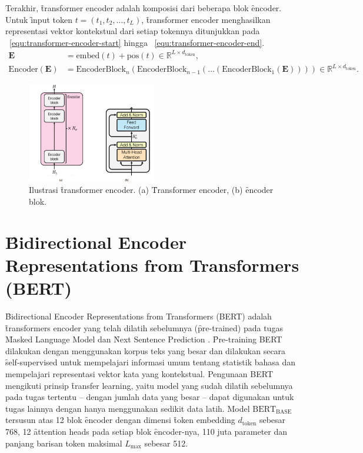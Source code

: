 	Terakhir, \f{transformer encoder} adalah komposisi dari beberapa blok \f{encoder}. Untuk \f{input} token $t=(t_1, t_2, \dots, t_L)$, \f{transformer encoder} menghasilkan representasi vektor kontekstual dari setiap tokennya ditunjukkan pada \equ~\ref{equ:transformer-encoder-start} hingga \equ~\ref{equ:transformer-encoder-end}.
	\begin{align}
		\label{equ:transformer-encoder-start} 
		\mathbf{E} &= \text{embed}(t)+ \text{pos}(t) \in \mathbb{R}^{L \times d_{\text{token}}}, \\
		\label{equ:transformer-encoder-end}
		\text{Encoder}(\mathbf{E}) &= \text{EncoderBlock}_n(\text{EncoderBlock}_{n-1}(\dots(\text{EncoderBlock}_1(\mathbf{E})))) \in \mathbb{R}^{L \times d_{\text{token}}}.
	\end{align}
	\begin{figure}
		\centering
		\includegraphics[width=0.5\textwidth]{assets/pics/final-transformers-encoder.png}
		\caption{Ilustrasi \f{transformer encoder}. (a) \f{Transformer encoder}, (b) \f{encoder} blok.}
		\label{fig:transformer-encoder}
	\end{figure}

\section{\f{Bidirectional Encoder Representations from Transformers} (BERT)}
\f{Bidirectional Encoder Representations from Transformers} (BERT) adalah \f{transformers encoder} yang telah dilatih sebelumnya (\f{pre-trained}) pada tugas \f{Masked Language Model} dan \f{Next Sentence Prediction} \citep{bertori}. \f{Pre-training} BERT dilakukan dengan menggunakan korpus teks yang besar dan dilakukan secara \f{self-supervised} untuk mempelajari informasi umum tentang statistik bahasa dan mempelajari representasi vektor kata yang kontekstual. Pengunaan BERT mengikuti prinsip \f{transfer learning}, yaitu model yang sudah dilatih sebelumnya pada tugas tertentu -- dengan jumlah data yang besar -- dapat digunakan untuk tugas lainnya dengan hanya menggunakan sedikit data latih. Model $\text{BERT}_{\text{BASE}}$ tersusun atas 12 blok \f{encoder} dengan dimensi \f{token embedding} $d_{\text{token}}$ sebesar 768, 12 \f{attention heads} pada setiap blok \f{encoder}-nya, 110 juta parameter dan panjang barisan token maksimal $L_{\max}$ sebesar 512.

